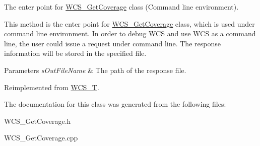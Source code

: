 The enter point for \hyperlink{classWCS__GetCoverage}{WCS\_\-GetCoverage} class (Command line environment). 

This method is the enter point for \hyperlink{classWCS__GetCoverage}{WCS\_\-GetCoverage} class, which is used under command line environment. In order to debug WCS and use WCS as a command line, the user could issue a request under command line. The response information will be stored in the specified file.


\begin{DoxyParams}{Parameters}
{\em sOutFileName} & The path of the response file. \\
\hline
\end{DoxyParams}


Reimplemented from \hyperlink{classWCS__T}{WCS\_\-T}.



The documentation for this class was generated from the following files:\begin{DoxyCompactItemize}
\item 
WCS\_\-GetCoverage.h\item 
WCS\_\-GetCoverage.cpp\end{DoxyCompactItemize}
